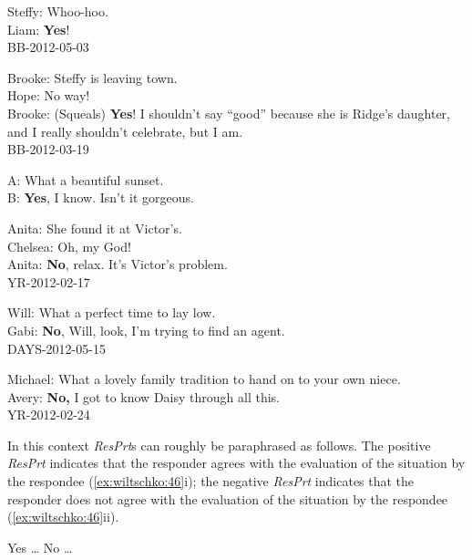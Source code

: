 \documentclass[output=paper]{LSP/langsci}
\begin{document}
\ea\label{ex:wiltschko:40}
Steffy: {Whoo-hoo.} \\
Liam: \textbf{{Yes}}{!}\\  
BB-2012-05-03
\z

\ea\label{ex:wiltschko:41}
Brooke:   {Steffy is leaving town}. \\
Hope:     {No way!} \\
Brooke:   (Squeals) \textbf{{Yes}}{! I shouldn't say “good” because she is Ridge's daughter, and I really shouldn't celebrate, but I am}. \\
BB-2012-03-19
\z

\ea\label{ex:wiltschko:42}
A: {What a beautiful sunset}.\\
B:  \textbf{{Yes}}{, I know. Isn’t it gorgeous}. 
\z

\ea\label{ex:wiltschko:43}
Anita:    {She found it at Victor's.} \\
Chelsea:   {Oh, my God!} \\
Anita:     \textbf{{No}}{, relax. It's Victor's problem.}\\
{YR-2012-02-17}
\z

\ea\label{ex:wiltschko:44}
Will:     {What a perfect time to lay low.} \\
Gabi:     \textbf{{No}}{, Will, look, I'm trying to find an agent.}\\
{DAYS-2012-05-15}
\z

\ea\label{ex:wiltschko:45}
Michael:   {What a lovely family tradition to hand on to your own} {niece.} \\
Avery:   \textbf{{No,}} {I got to know Daisy through all this.}\\
{YR-2012-02-24}
\z

In this context \textit{ResPrt}s can roughly be paraphrased as follows. The positive \textit{ResPrt} indicates that the responder agrees with the evaluation of the situation by the respondee (\ref{ex:wiltschko:46}i); the negative \textit{ResPrt} indicates that the responder does not agree with the evaluation of the situation by the respondee (\ref{ex:wiltschko:46}ii).

\ea\label{ex:wiltschko:46}
\begin{xlist}
\relax  [Exclamative{!}]    
\begin{xlisti}
\ex\label{ex:wiltschko:46i} Yes …   
\ex\label{ex:wiltschko:46ii} No …   
\end{xlisti}
\end{xlist}
\z
\end{document}
